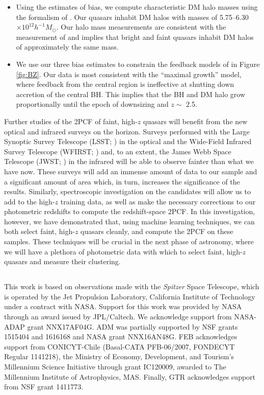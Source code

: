 \documentclass[apj, numberedappendix]{emulateapj}
\begin{document}
\begin{itemize}
    \item{Using the estimates of bias, we compute characteristic DM halo masses using the formalism of \citet{Tinker2010}. Our quasars inhabit DM halos with masses of 5.75--6.30$\times 10^{12}h^{-1} M_{\odot}$. Our halo mass measurements are consistent with the measurement of \citet{Shen2007} and implies that bright and faint quasars inhabit DM halos of approximately the same mass.}
    
    \item{We use our three bias estimates to constrain the feedback models of \citet{Hopkins2007} in Figure \ref{fig:BZ}. Our data is most consistent with the ``maximal growth'' model, where feedback from the central region is ineffective at shutting down accretion of the central BH. This implies that the BH and DM halo grow proportionally until the epoch of downsizing and $z \sim$ 2.5.}
   

\end{itemize}

Further studies of the 2PCF of faint, high-$z$ quasars will benefit from the new optical and infrared surveys on the horizon. Surveys performed with the Large Synoptic Survey Telescope (LSST; \citealt{Abell2009}) in the optical and the Wide-Field Infrared Survey Telescope (WFIRST; \citealt{Spergel2013}) and, to an extent, the James Webb Space Telescope (JWST; \citealt{Gardner2006}) in the infrared will be able to observe fainter than what we have now. These surveys will add an immense amount of data to our sample and a significant amount of area which, in turn, increases the significance of the results. Similarly, spectroscopic investigation on the candidates will allow us to add to the high-$z$ training data, as well as make the necessary corrections to our photometric redshifts to compute the redshift-space 2PCF. In this investigation, however, we have demonstrated that, using machine learning techniques, we can both select faint, high-$z$ quasars cleanly, and compute the 2PCF on these samples. These techniques will be crucial in the next phase of astronomy, where we will have a plethora of photometric data with which to select faint, high-$z$ quasars and measure their clustering.

\subsection*{}
This work is based on observations made with the \emph{Spitzer} Space Telescope, which is operated by the Jet Propulsion Laboratory, California Institute of Technology under a contract with NASA. Support for this work was provided by NASA through an award issued by JPL/Caltech. We acknowledge support from NASA-ADAP grant NNX17AF04G. ADM was partially supported by NSF grants 1515404 and 1616168 and NASA grant NNX16AN48G. FEB acknowledges support from CONICYT-Chile 
(Basal-CATA PFB-06/2007, FONDECYT Regular 1141218), the Ministry of Economy, Development, and Tourism's Millennium Science Initiative through grant IC120009, awarded to The Millennium Institute of Astrophysics, MAS. Finally, GTR acknowledges support from NSF grant 1411773.
\end{document}
